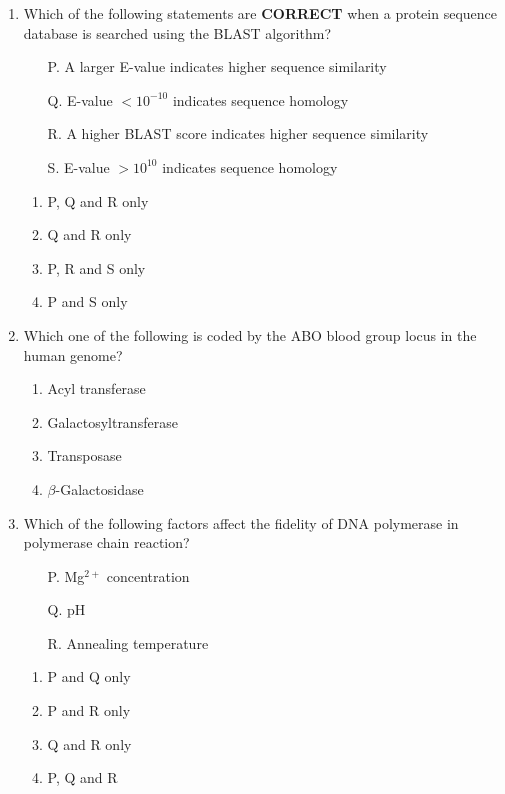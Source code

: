 \documentclass[12pt]{article}
\begin{document}
\begin{enumerate}[label=Q.\arabic*,start=26]
	\item Which of the following statements are \textbf{CORRECT} when a protein sequence database is searched using the BLAST algorithm?

		\begin{itemize}
			\item[P.] A larger E-value indicates higher sequence similarity
			\item[Q.] E-value $< 10^{-10}$ indicates sequence homology
			\item[R.] A higher BLAST score indicates higher sequence similarity
			\item[S.] E-value $> 10^{10}$ indicates sequence homology
		\end{itemize}

		\begin{enumerate}[label=(\Alph*)]
			\item P, Q and R only
			\item Q and R only
			\item P, R and S only
			\item P and S only
		\end{enumerate}
	\item Which one of the following is coded by the ABO blood group locus in the human genome?
		\begin{enumerate}[label=(\Alph*)]
			\item Acyl transferase
			\item Galactosyltransferase
			\item Transposase
			\item $\beta$-Galactosidase
		\end{enumerate}

	\item Which of the following factors affect the fidelity of DNA polymerase in polymerase chain reaction?
		\begin{itemize}
			\item[P.] Mg$^{2+}$ concentration
			\item[Q.] pH
			\item[R.] Annealing temperature
		\end{itemize}

		\begin{enumerate}[label=(\Alph*)]
			\item P and Q only
			\item P and R only
			\item Q and R only
			\item P, Q and R
		\end{enumerate}


\end{enumerate}
\end{document}
